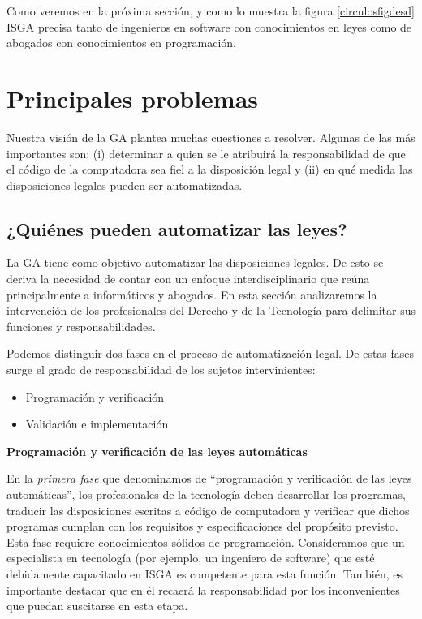 \documentclass[12pt]{report} %
\begin{document}
Como veremos en la próxima sección, y como lo muestra la figura \ref{circulosfigdesd} ISGA precisa tanto de ingenieros en software con conocimientos en leyes como de abogados con conocimientos en programación.

\section{Principales problemas }

Nuestra visión de la GA plantea muchas cuestiones a resolver. Algunas de las más importantes son: (i) determinar a quien se le atribuirá la responsabilidad de que el código de la computadora sea fiel a la disposición legal y (ii) en qué medida las disposiciones legales pueden ser automatizadas. 

\subsection{¿Quiénes pueden automatizar las leyes? }

La GA tiene como objetivo automatizar las disposiciones legales. De esto se deriva la necesidad de contar con un enfoque interdisciplinario que reúna principalmente a informáticos y abogados. En esta sección analizaremos la intervención de los profesionales del Derecho y de la Tecnología para delimitar sus funciones y responsabilidades. 

Podemos distinguir dos fases en el proceso de automatización legal. De estas fases surge el grado de responsabilidad de los sujetos intervinientes:

\begin{itemize}

    \item{Programación y verificación} 
    \item{Validación e implementación}
    
\end{itemize}

\textbf{Programación y verificación de las leyes automáticas}

En la \textit{primera fase} que denominamos de “programación y verificación de las leyes automáticas”, los profesionales de la tecnología deben desarrollar los programas, traducir las disposiciones escritas a código de computadora y verificar que dichos programas cumplan con los requisitos y especificaciones del propósito previsto. Esta fase requiere conocimientos sólidos de programación. Consideramos que un especialista en tecnología (por ejemplo, un ingeniero de software) que esté debidamente capacitado en ISGA es competente para esta función. También, es importante destacar que en él recaerá la responsabilidad por los inconvenientes que puedan suscitarse en esta etapa.
\end{document}
